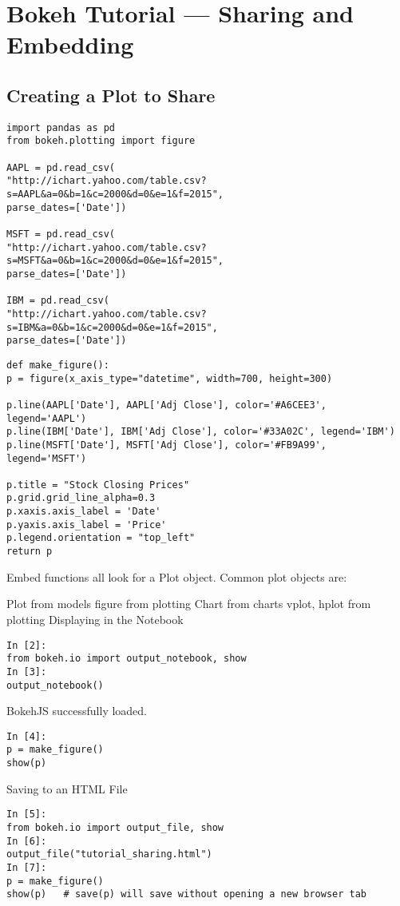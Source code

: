 \documentclass[a4paper,12pt]{article}
\begin{document}
\section{Bokeh Tutorial — Sharing and Embedding}
\subsection{Creating a Plot to Share}
\begin{framed}
\begin{verbatim}
import pandas as pd
from bokeh.plotting import figure

AAPL = pd.read_csv(
"http://ichart.yahoo.com/table.csv?s=AAPL&a=0&b=1&c=2000&d=0&e=1&f=2015",
parse_dates=['Date'])

MSFT = pd.read_csv(
"http://ichart.yahoo.com/table.csv?s=MSFT&a=0&b=1&c=2000&d=0&e=1&f=2015",
parse_dates=['Date'])

IBM = pd.read_csv(
"http://ichart.yahoo.com/table.csv?s=IBM&a=0&b=1&c=2000&d=0&e=1&f=2015",
parse_dates=['Date'])
\end{verbatim}
\end{framed}

\begin{framed}
	\begin{verbatim}
def make_figure():
p = figure(x_axis_type="datetime", width=700, height=300)

p.line(AAPL['Date'], AAPL['Adj Close'], color='#A6CEE3', legend='AAPL')
p.line(IBM['Date'], IBM['Adj Close'], color='#33A02C', legend='IBM')
p.line(MSFT['Date'], MSFT['Adj Close'], color='#FB9A99', legend='MSFT')

p.title = "Stock Closing Prices"
p.grid.grid_line_alpha=0.3
p.xaxis.axis_label = 'Date'
p.yaxis.axis_label = 'Price'
p.legend.orientation = "top_left"
return p
\end{verbatim}
\end{framed}

Embed functions all look for a Plot object. Common plot objects are:

Plot from models
figure from plotting
Chart from charts
vplot, hplot from plotting
Displaying in the Notebook

\begin{framed}
\begin{verbatim}
In [2]:
from bokeh.io import output_notebook, show
In [3]:
output_notebook()
\end{verbatim}
\end{framed}
BokehJS successfully loaded.
\begin{framed}
\begin{verbatim}
In [4]:
p = make_figure()
show(p)
\end{verbatim}
\end{framed}
Saving to an HTML File
\begin{verbatim}
In [5]:
from bokeh.io import output_file, show
In [6]:
output_file("tutorial_sharing.html")
In [7]:
p = make_figure()
show(p)   # save(p) will save without opening a new browser tab
\end{verbatim}
\end{document}
